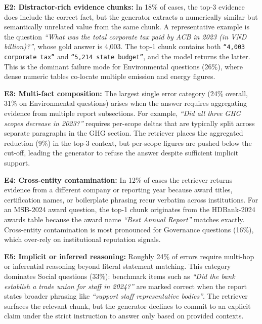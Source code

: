 \documentclass[sn-mathphys, oneside]{sn-jnl}
\begin{document}
\textbf{E2: Distractor-rich evidence chunks: }In 18\% of cases, the top-3 evidence does include the correct fact, but the
generator extracts a numerically similar but semantically unrelated value from
the same chunk. A representative example is the question
\textit{``What was the total corporate tax paid by ACB in 2023 (in VND billion)?''},
whose gold answer is 4{,}003. The top-1 chunk contains both
\texttt{``4{,}003 corporate tax''} and \texttt{``5{,}214 state budget''}, and the
model returns the latter. This is the dominant failure mode for Environmental
questions (26\%), where dense numeric tables co-locate multiple emission and
energy figures.

\textbf{E3: Multi-fact composition:} The largest single error category (24\% overall, 31\% on Environmental questions)
arises when the answer requires aggregating evidence from multiple report
subsections. For example,
\textit{``Did all three GHG scopes decrease in 2023?''} requires per-scope deltas
that are typically split across separate paragraphs in the GHG section. The
retriever places the aggregated reduction (9\%) in the top-3 context, but
per-scope figures are pushed below the cut-off, leading the generator to refuse
the answer despite sufficient implicit support.

\textbf{E4: Cross-entity contamination:} In 12\% of cases the retriever returns evidence from a different company or
reporting year because award titles, certification names, or boilerplate
phrasing recur verbatim across institutions. For an MSB-2024 award question, the
top-1 chunk originates from the HDBank-2024 awards table because the award name
\textit{``Best Annual Report''} matches exactly. Cross-entity contamination is
most pronounced for Governance questions (16\%), which over-rely on
institutional reputation signals.

\textbf{E5: Implicit or inferred reasoning:} Roughly 24\% of errors require multi-hop or inferential reasoning beyond
literal statement matching. This category dominates Social questions (33\%):
benchmark items such as \textit{``Did the bank establish a trade union for
staff in 2024?''} are marked correct when the report states broader phrasing
like \textit{``support staff representative bodies''}. The retriever surfaces
the relevant chunk, but the generator declines to commit to an explicit claim
under the strict instruction to answer only based on provided contexts.
\end{document}
